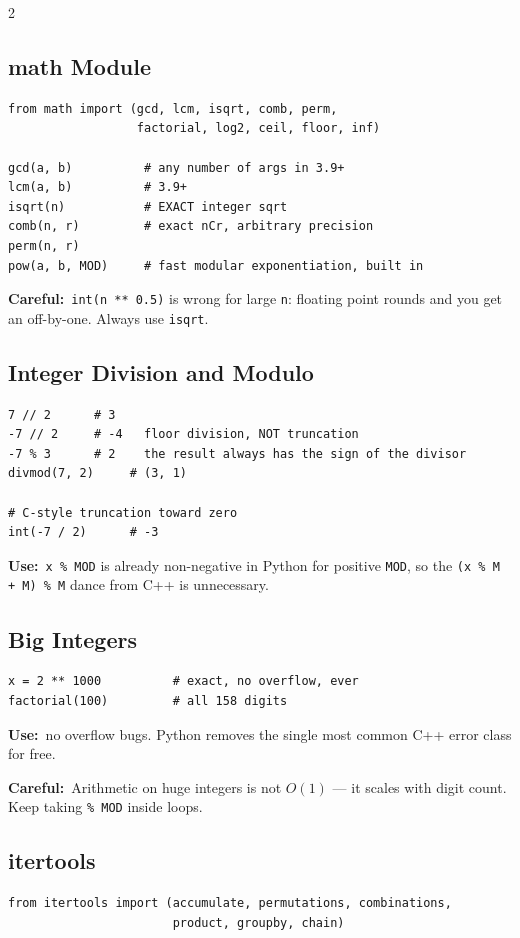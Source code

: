\documentclass[10pt]{article}
\newcommand{\code}[1]{\texttt{\small #1}}
\newcommand{\uses}[1]{{\color{accent2}\footnotesize\textbf{Use:}}~{\footnotesize #1}\par}
\newcommand{\warn}[1]{{\color{warnc}\footnotesize\textbf{Careful:}}~{\footnotesize #1}\par}
\begin{document}
\begin{multicols}{2}
\subsection{math Module}
\begin{lstlisting}
from math import (gcd, lcm, isqrt, comb, perm,
                  factorial, log2, ceil, floor, inf)

gcd(a, b)          # any number of args in 3.9+
lcm(a, b)          # 3.9+
isqrt(n)           # EXACT integer sqrt
comb(n, r)         # exact nCr, arbitrary precision
perm(n, r)
pow(a, b, MOD)     # fast modular exponentiation, built in
\end{lstlisting}
\warn{\code{int(n ** 0.5)} is wrong for large \code{n}: floating point
rounds and you get an off-by-one. Always use \code{isqrt}.}

\subsection{Integer Division and Modulo}
\begin{lstlisting}
7 // 2      # 3
-7 // 2     # -4   floor division, NOT truncation
-7 % 3      # 2    the result always has the sign of the divisor
divmod(7, 2)     # (3, 1)

# C-style truncation toward zero
int(-7 / 2)      # -3
\end{lstlisting}
\uses{\code{x \% MOD} is already non-negative in Python for positive
\code{MOD}, so the \code{(x \% M + M) \% M} dance from C++ is
unnecessary.}

\subsection{Big Integers}
\begin{lstlisting}
x = 2 ** 1000          # exact, no overflow, ever
factorial(100)         # all 158 digits
\end{lstlisting}
\uses{no overflow bugs. Python removes the single most common C++ error
class for free.}
\warn{Arithmetic on huge integers is not $O(1)$ --- it scales with digit
count. Keep taking \code{\% MOD} inside loops.}

\subsection{itertools}
\begin{lstlisting}
from itertools import (accumulate, permutations, combinations,
                       product, groupby, chain)


\end{lstlisting}
\end{multicols}
\end{document}
